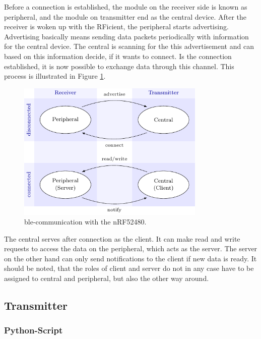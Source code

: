 Before a connection is established, the module on the receiver side is known as peripheral, and the module on transmitter end as the central device.
After the receiver is woken up with the RFicient, the peripheral starts advertising.
Advertising basically means sending data packets periodically with information for the central device.
The central is scanning for the this advertisement and can based on this information decide, if it wants to connect.
Is the connection established, it is now possible to exchange data through this channel.
This process is illustrated in Figure \ref{software:ble}.
\begin{figure}[ht]
	\centering
	\includegraphics[width=0.8\textwidth]{4-development/software/graphics/ble.pdf}
	\caption{\acs{ble}-communication with the nRF52480.\label{software:ble}}
\end{figure}

The central serves after connection as the client.
It can make read and write requests to access the data on the peripheral, which acts as the server.
The server on the other hand can only send notifications to the client if new data is ready.
It should be noted, that the roles of client and server do not in any case have to be assigned to central and peripheral, but also the other way around. 

\subsection{Transmitter}

\subsubsection{Python-Script}
\lstset{basicstyle=\footnotesize}
\lstset{style=mystyle}

